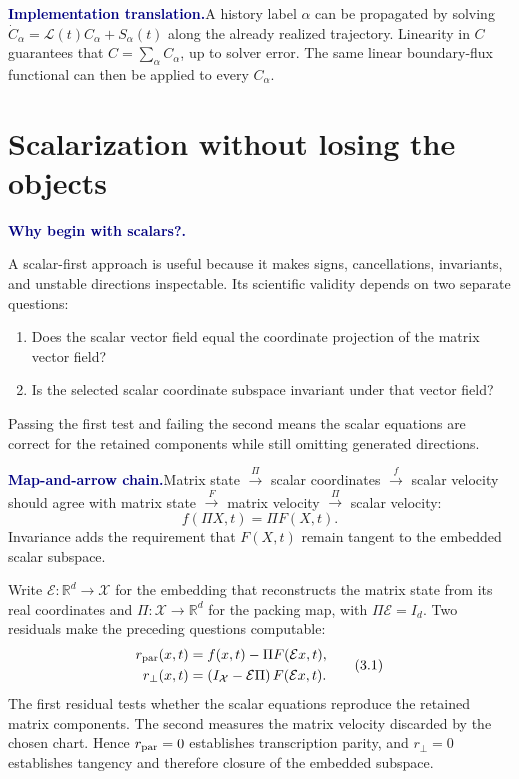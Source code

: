 \documentclass[10pt]{article}
\newcommand{\R}{\mathbb R}
\newcommand{\pedbox}[2]{%
  \par\medskip
  \noindent\colorbox{pale}{%
    \parbox{\dimexpr\linewidth-2\fboxsep\relax}{%
      \textcolor{navy}{\textbf{#1}}\quad #2%
    }%
  }\par\medskip
}
\newcommand{\implementationbox}[1]{\pedbox{Implementation translation.}{#1}}
\newcommand{\flowlead}[1]{%
  \par\medskip
  \needspace{3\baselineskip}%
  \noindent\textcolor{navy}{\textbf{#1.}}\enspace\ignorespaces
}
\begin{document}
\implementationbox{A history label \(\alpha\) can be propagated by solving
\(\dot C_\alpha=\mathcal L(t)C_\alpha+S_\alpha(t)\) along the already realized
trajectory.  Linearity in \(C\) guarantees that
\(C=\sum_\alpha C_\alpha\), up to solver error.  The same linear boundary-flux
functional can then be applied to every \(C_\alpha\).}

\part{Scalarization without losing the objects}

\flowlead{Why begin with scalars?}

A scalar-first approach is useful because it makes signs, cancellations,
invariants, and unstable directions inspectable.  Its scientific validity
depends on two separate questions:
\begin{enumerate}
  \item Does the scalar vector field equal the coordinate projection of the
  matrix vector field?
  \item Is the selected scalar coordinate subspace invariant under that
  vector field?
\end{enumerate}
Passing the first test and failing the second means the scalar equations are
correct for the retained components while still omitting generated
directions.

\pedbox{Map-and-arrow chain.}{Matrix state
\(\xrightarrow{\;\Pi\;}\) scalar coordinates
\(\xrightarrow{\;f\;}\) scalar velocity should agree with matrix state
\(\xrightarrow{\;F\;}\) matrix velocity
\(\xrightarrow{\;\Pi\;}\) scalar velocity:
\[
f(\Pi X,t)=\Pi F(X,t).
\]
Invariance adds the requirement that \(F(X,t)\) remain tangent to the embedded
scalar subspace.}

Write \(\mathcal E:\R^d\to\mathcal X\) for the embedding that reconstructs
the matrix state from its real coordinates and
\(\Pi:\mathcal X\to\R^d\) for the packing map, with
\(\Pi\mathcal E=I_d\).  Two residuals make the preceding questions
computable:
\[
\begin{aligned}
r_{\rm par}(x,t)
&=f(x,t)-\Pi F(\mathcal E x,t),\\
r_{\perp}(x,t)
&=\left(I_{\mathcal X}-\mathcal E\Pi\right)
F(\mathcal E x,t).
\end{aligned}
\tag{3.1}
\]
The first residual tests whether the scalar equations reproduce the retained
matrix components.  The second measures the matrix velocity discarded by the
chosen chart.  Hence \(r_{\rm par}=0\) establishes transcription parity, and
\(r_{\perp}=0\) establishes tangency and therefore closure of the embedded
subspace.
\end{document}
